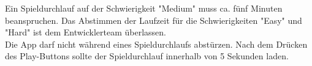 Ein Spieldurchlauf auf der Schwierigkeit "Medium" \gls{muss} ca. fünf Minuten beanspruchen. Das Abstimmen der Laufzeit für die Schwierigkeiten "Easy" und "Hard" ist dem Entwicklerteam überlassen.
\\
Die App darf nicht während eines Spieldurchlaufs abstürzen. Nach dem Drücken des Play-Buttons \gls{sollte} der Spieldurchlauf innerhalb von 5 Sekunden laden.